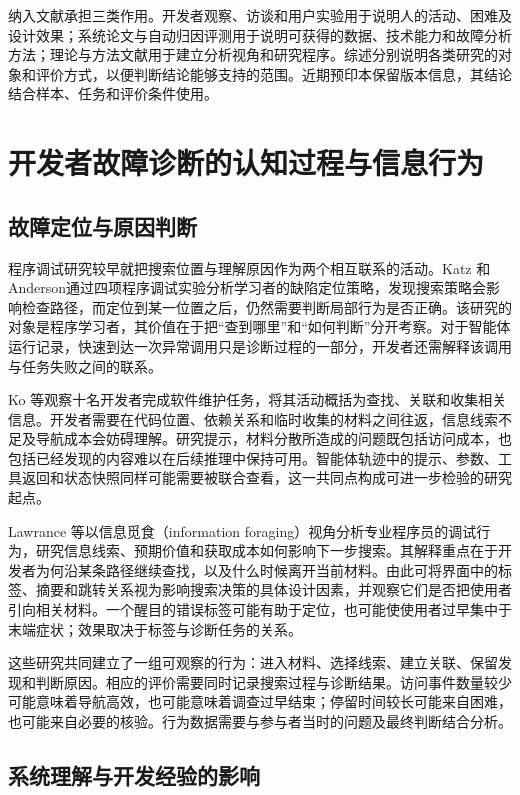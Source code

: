 纳入文献承担三类作用。开发者观察、访谈和用户实验用于说明人的活动、困难及设计效果；系统论文与自动归因评测用于说明可获得的数据、技术能力和故障分析方法；理论与方法文献用于建立分析视角和研究程序。综述分别说明各类研究的对象和评价方式，以便判断结论能够支持的范围。近期预印本保留版本信息，其结论结合样本、任务和评价条件使用。

\section{开发者故障诊断的认知过程与信息行为}

\subsection{故障定位与原因判断}

程序调试研究较早就把搜索位置与理解原因作为两个相互联系的活动。Katz 和 Anderson\cite{ref15}通过四项程序调试实验分析学习者的缺陷定位策略，发现搜索策略会影响检查路径，而定位到某一位置之后，仍然需要判断局部行为是否正确。该研究的对象是程序学习者，其价值在于把“查到哪里”和“如何判断”分开考察。对于智能体运行记录，快速到达一次异常调用只是诊断过程的一部分，开发者还需解释该调用与任务失败之间的联系。

Ko 等\cite{ref14}观察十名开发者完成软件维护任务，将其活动概括为查找、关联和收集相关信息。开发者需要在代码位置、依赖关系和临时收集的材料之间往返，信息线索不足及导航成本会妨碍理解。研究提示，材料分散所造成的问题既包括访问成本，也包括已经发现的内容难以在后续推理中保持可用。智能体轨迹中的提示、参数、工具返回和状态快照同样可能需要被联合查看，这一共同点构成可进一步检验的研究起点。

Lawrance 等\cite{ref08}以信息觅食（information foraging）视角分析专业程序员的调试行为，研究信息线索、预期价值和获取成本如何影响下一步搜索。其解释重点在于开发者为何沿某条路径继续查找，以及什么时候离开当前材料。由此可将界面中的标签、摘要和跳转关系视为影响搜索决策的具体设计因素，并观察它们是否把使用者引向相关材料。一个醒目的错误标签可能有助于定位，也可能使使用者过早集中于末端症状；效果取决于标签与诊断任务的关系。

这些研究共同建立了一组可观察的行为：进入材料、选择线索、建立关联、保留发现和判断原因。相应的评价需要同时记录搜索过程与诊断结果。访问事件数量较少可能意味着导航高效，也可能意味着调查过早结束；停留时间较长可能来自困难，也可能来自必要的核验。行为数据需要与参与者当时的问题及最终判断结合分析。

\subsection{系统理解与开发经验的影响}

